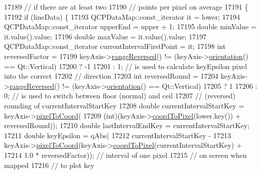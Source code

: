 \begin{DoxyCode}
17189                                                   \textcolor{comment}{// if there are at least two}
17190                                                   \textcolor{comment}{// points per pixel on average}
17191   \{
17192     \textcolor{keywordflow}{if} (lineData) \{
17193       QCPDataMap::const\_iterator it = lower;
17194       QCPDataMap::const\_iterator upperEnd = upper + 1;
17195       \textcolor{keywordtype}{double} minValue = it.value().value;
17196       \textcolor{keywordtype}{double} maxValue = it.value().value;
17197       QCPDataMap::const\_iterator currentIntervalFirstPoint = it;
17198       \textcolor{keywordtype}{int} reversedFactor =
17199           keyAxis->\hyperlink{class_q_c_p_axis_ade26dc7994ccd8a11f64fd83377ee021}{rangeReversed}() != (keyAxis->\hyperlink{class_q_c_p_axis_a57483f2f60145ddc9e63f3af53959265}{orientation}() == Qt::Vertical)
17200               ? -1
17201               : 1; \textcolor{comment}{// is used to calculate keyEpsilon pixel into the correct}
17202                    \textcolor{comment}{// direction}
17203       \textcolor{keywordtype}{int} reversedRound =
17204           keyAxis->\hyperlink{class_q_c_p_axis_ade26dc7994ccd8a11f64fd83377ee021}{rangeReversed}() != (keyAxis->\hyperlink{class_q_c_p_axis_a57483f2f60145ddc9e63f3af53959265}{orientation}() == Qt::Vertical)
17205               ? 1
17206               : 0; \textcolor{comment}{// is used to switch between floor (normal) and ceil}
17207                    \textcolor{comment}{// (reversed) rounding of currentIntervalStartKey}
17208       \textcolor{keywordtype}{double} currentIntervalStartKey = keyAxis->\hyperlink{class_q_c_p_axis_ae9289ef7043b9d966af88eaa95b037d1}{pixelToCoord}(
17209           (\textcolor{keywordtype}{int})(keyAxis->\hyperlink{class_q_c_p_axis_a985ae693b842fb0422b4390fe36d299a}{coordToPixel}(lower.key()) + reversedRound));
17210       \textcolor{keywordtype}{double} lastIntervalEndKey = currentIntervalStartKey;
17211       \textcolor{keywordtype}{double} keyEpsilon = qAbs(
17212           currentIntervalStartKey -
17213           keyAxis->\hyperlink{class_q_c_p_axis_ae9289ef7043b9d966af88eaa95b037d1}{pixelToCoord}(keyAxis->\hyperlink{class_q_c_p_axis_a985ae693b842fb0422b4390fe36d299a}{coordToPixel}(currentIntervalStartKey) +
17214                                 1.0 * reversedFactor)); \textcolor{comment}{// interval of one pixel}
17215                                                         \textcolor{comment}{// on screen when mapped}
17216                                                         \textcolor{comment}{// to plot key}

\end{DoxyCode}
